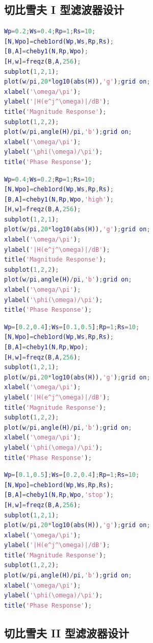 \documentclass[12pt,AutoFakeBold]{article}
\begin{document}
\begin{appendices}
\subsection{切比雪夫 I 型滤波器设计}

\begin{lstlisting}[language=Matlab]
%低通
Wp=0.2;Ws=0.4;Rp=1;Rs=10;
[N,Wpo]=cheb1ord(Wp,Ws,Rp,Rs);
[B,A]=cheby1(N,Rp,Wpo);
[H,w]=freqz(B,A,256);
subplot(1,2,1);
plot(w/pi,20*log10(abs(H)),'g');grid on;
xlabel('\omega/\pi');
ylabel('|H(e^j^\omega)|/dB');
title('Magnitude Response');
subplot(1,2,2);
plot(w/pi,angle(H)/pi,'b');grid on;
xlabel('\omega/\pi');
ylabel('\phi(\omega)/\pi');
title('Phase Response');
\end{lstlisting}

\begin{lstlisting}[language=Matlab]
%高通
Wp=0.4;Ws=0.2;Rp=1;Rs=10;
[N,Wpo]=cheb1ord(Wp,Ws,Rp,Rs);
[B,A]=cheby1(N,Rp,Wpo,'high');
[H,w]=freqz(B,A,256);
subplot(1,2,1);
plot(w/pi,20*log10(abs(H)),'g');grid on;
xlabel('\omega/\pi');
ylabel('|H(e^j^\omega)|/dB');
title('Magnitude Response');
subplot(1,2,2);
plot(w/pi,angle(H)/pi,'b');grid on;
xlabel('\omega/\pi');
ylabel('\phi(\omega)/\pi');
title('Phase Response');
\end{lstlisting}

\begin{lstlisting}[language=Matlab]
%带通
Wp=[0.2,0.4];Ws=[0.1,0.5];Rp=1;Rs=10;
[N,Wpo]=cheb1ord(Wp,Ws,Rp,Rs);
[B,A]=cheby1(N,Rp,Wpo);
[H,w]=freqz(B,A,256);
subplot(1,2,1);
plot(w/pi,20*log10(abs(H)),'g');grid on;
xlabel('\omega/\pi');
ylabel('|H(e^j^\omega)|/dB');
title('Magnitude Response');
subplot(1,2,2);
plot(w/pi,angle(H)/pi,'b');grid on;
xlabel('\omega/\pi');
ylabel('\phi(\omega)/\pi');
title('Phase Response');
\end{lstlisting}

\begin{lstlisting}[language=Matlab]
%带阻
Wp=[0.1,0.5];Ws=[0.2,0.4];Rp=1;Rs=10;
[N,Wpo]=cheb1ord(Wp,Ws,Rp,Rs);
[B,A]=cheby1(N,Rp,Wpo,'stop');
[H,w]=freqz(B,A,256);
subplot(1,2,1);
plot(w/pi,20*log10(abs(H)),'g');grid on;
xlabel('\omega/\pi');
ylabel('|H(e^j^\omega)|/dB');
title('Magnitude Response');
subplot(1,2,2);
plot(w/pi,angle(H)/pi,'b');grid on;
xlabel('\omega/\pi');
ylabel('\phi(\omega)/\pi');
title('Phase Response');
\end{lstlisting}

\subsection{切比雪夫 II 型滤波器设计}


\end{appendices}
\end{document}
